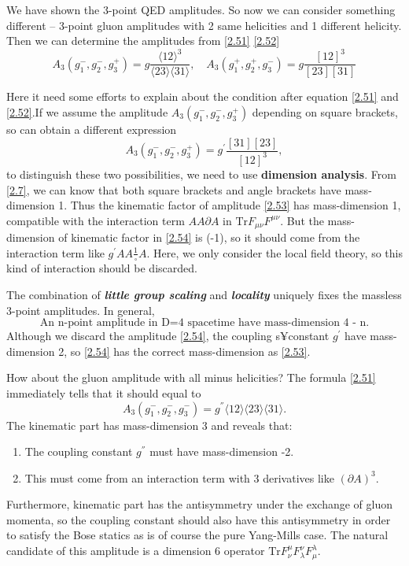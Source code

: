 \documentclass[12pt]{article}
\numberwithin{equation}{section}
\newcommand{\mdavg}[2]{\langle #1 \rangle\!\langle #2 \rangle}
\newcommand{\avg}[1]{\langle #1 \rangle}
\newcommand{\tif}[1]{\textit{\textbf{#1}}}
\begin{document}
We have shown the 3-point QED amplitudes. So now we can consider something different -- 3-point gluon amplitudes with 2 same helicities and 1 different helicity.
Then we can determine the amplitudes from \eqref{2.51} \eqref{2.52}
\begin{equation}
    A_3(g_1^-,g_2^-,g_3^+)=g\frac{\avg{12}^3}{\avg{23}\!\avg{31}}, \quad A_3(g_1^+,g_2^+,g_3^-)=g\frac{[12]^3}{[23][31]} \label{2.53}
\end{equation}

Here it need some efforts to explain about the condition after equation \eqref{2.51} and \eqref{2.52}.If we assume the amplitude
$A_3(g_1^-,g_2^-,g_3^+)$ depending on square brackets, so can obtain a different expression
\begin{equation}
    A_3(g_1^-,g_2^-,g_3^+)=g^{'}\frac{[31][23]}{[12]^3},
    \label{2.54}
\end{equation}
to distinguish these two possibilities, we need to use \textbf{dimension analysis}. From \eqref{2.7}, we can know that both square brackets and angle brackets have mass-dimension 1. 
Thus the kinematic factor of amplitude \eqref{2.53} has mass-dimension 1, compatible with the interaction term $AA\partial A$ in $\mathrm{Tr}F_{\mu\nu}F^{\mu\nu}$. But the mass-dimension 
of kinematic factor in \eqref{2.54} is (-1), so it should come from the interaction term like $g^{'}AA\frac{1}{\square }A$. Here, we only consider the local field theory, so this kind of interaction
should be discarded.

The combination of \tif{little group scaling} and \tif{locality} uniquely fixes the massless 3-point amplitudes. In general, 
\begin{equation}
    \text{An n-point amplitude in D=4 spacetime have mass-dimension 4 - n.}
\end{equation}
Although we discard the amplitude \eqref{2.54}, the coupling s¥constant $g^{'}$ have mass-dimension 2, so \eqref{2.54} has the correct mass-dimension as \eqref{2.53}.

How about the gluon amplitude with all minus helicities? The formula \eqref{2.51} immediately tells that it should equal to
\begin{equation}
    A_3(g_1^-,g_2^-,g_3^-)=g^{''}\mdavg{12}{23}\!\avg{31}.
\end{equation}
The kinematic part has mass-dimension 3 and reveals that: 
\begin{enumerate}
    \item The coupling constant $g^{''}$ must have mass-dimension -2.
    \item This must come from an interaction term with 3 derivatives like $(\partial A)^3$.
\end{enumerate}
Furthermore, kinematic part has the antisymmetry under the exchange of gluon momenta, so the coupling constant should 
also have this antisymmetry in order to satisfy the Bose statics as is of course the pure Yang-Mills case. 
The natural candidate of this amplitude is a dimension 6 operator $\mathrm{Tr}F^\mu_\nu F^\nu_\lambda F^\lambda _\mu$. 
\end{document}
